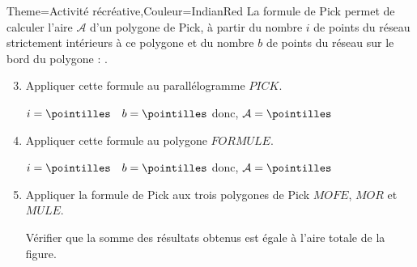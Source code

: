 \begin{Maquette}[Cours]{Theme={Activité récréative},Couleur={IndianRed}}
         La formule de Pick permet de calculer l'aire $\mathcal{A}$ d'un polygone de Pick, à partir du nombre $i$ de points du réseau strictement intérieurs à ce polygone et du nombre $b$ de points du réseau sur le bord du polygone : . 
         \begin{enumerate}
         \setcounter{enumi}{2}
            \item Appliquer cette formule au parallélogramme $PICK$. \par \bigskip
               $i =\pointilles  \quad b =\pointilles $ \quad donc, $\mathcal{A} = \pointilles $ \par
            \item Appliquer cette formule au polygone $FORMULE$. \par \bigskip
               $i =\pointilles  \quad b =\pointilles $ \quad donc, $\mathcal{A} = \pointilles $ \par
            \item Appliquer la formule de Pick aux trois polygones de Pick $MOFE$, $MOR$ et $MULE$. \par
               Vérifier que la somme des résultats obtenus est égale à l'aire totale de la figure. \par \medskip
               \pointilles \par \medskip
               \pointilles \par \medskip
               \pointilles 
         \end{enumerate}

\end{Maquette}